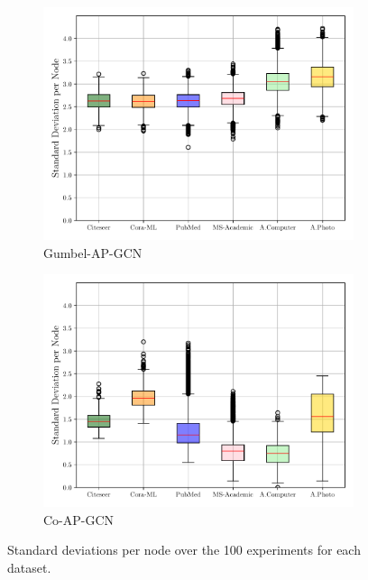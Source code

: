 \documentclass{gdl}
\begin{document}
\begin{figure}[p]
\begin{minipage}[t]{0.48\textwidth}
        \begin{subfigure}[b]{0.7\textwidth}
            \centering
            \includegraphics[width=\textwidth]{Gumbel-AP-GCN_std_steps_per_node_boxplot.pdf}
            \captionsetup{justification=centerlast}
            \caption{Gumbel-AP-GCN}
            \label{fig:step_std_Gumbel_AP_GCN}
        \end{subfigure}
        
        \begin{subfigure}[b]{0.7\textwidth}
            \centering
            \includegraphics[width=\textwidth]{Spinelli_std_steps_per_node_boxplot.pdf}
            \captionsetup{justification=centerlast}
            \caption{Co-AP-GCN}
            \label{fig:step_std_Co_AP_GCN}
        \end{subfigure}
        
        \captionsetup{justification=centerlast}
        \caption{Standard deviations per node over the 100 experiments for each dataset.}
        \label{fig:steps-dist-steps-std}
    \end{minipage}
\end{figure}
\end{document}
